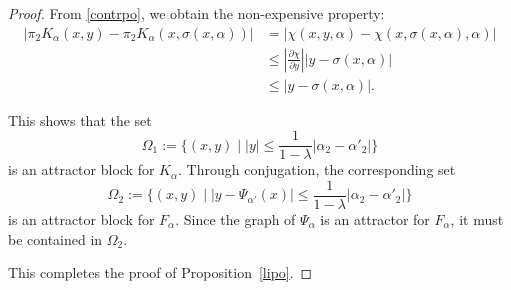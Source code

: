 \documentclass[10pt,a4paper]{amsart}
\begin{document}
\begin{proof}
From \eqref{contrpo}, we obtain the non-expensive property:
\begin{align*}
|\pi_2 K_\alpha(x,y) - \pi_2 K_\alpha(x, \sigma(x, \alpha))|
&= |\chi(x,y,\alpha) - \chi(x, \sigma(x, \alpha), \alpha)| \\
&\leq \left|\frac{\partial \chi}{\partial y}\right| |y - \sigma(x, \alpha)| \\
&\leq |y - \sigma(x, \alpha)|.
\end{align*}

This shows that the set
\[
\Omega_1 := \{(x,y) \mid |y| \leq \frac{1}{1-\lambda}|\alpha_2 - \alpha'_2|\}
\]
is an attractor block for $K_\alpha$. Through conjugation, the corresponding set
\[
\Omega_2 := \{(x,y) \mid |y - \Psi_{\alpha'}(x)| \leq \frac{1}{1-\lambda}|\alpha_2 - \alpha'_2|\}
\]
is an attractor block for $F_\alpha$. Since the graph of $\Psi_\alpha$ is an attractor for $F_\alpha$, it must be contained in $\Omega_2$.

This completes the proof of Proposition~\ref{lipo}.
\end{proof}
\end{document}
